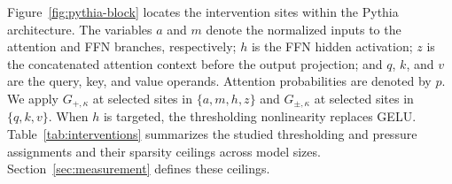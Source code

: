 Figure~\ref{fig:pythia-block} locates the intervention sites within the Pythia architecture. The variables $a$ and $m$ denote the normalized inputs to the attention and FFN branches, respectively; $h$ is the FFN hidden activation; $z$ is the concatenated attention context before the output projection; and $q$, $k$, and $v$ are the query, key, and value operands. Attention probabilities are denoted by $p$. We apply $G_{+,\kappa}$ at selected sites in $\{a,m,h,z\}$ and $G_{\pm,\kappa}$ at selected sites in $\{q,k,v\}$. When $h$ is targeted, the thresholding nonlinearity replaces GELU. Table~\ref{tab:interventions} summarizes the studied thresholding and pressure assignments and their sparsity ceilings across model sizes. Section~\ref{sec:measurement} defines these ceilings.


